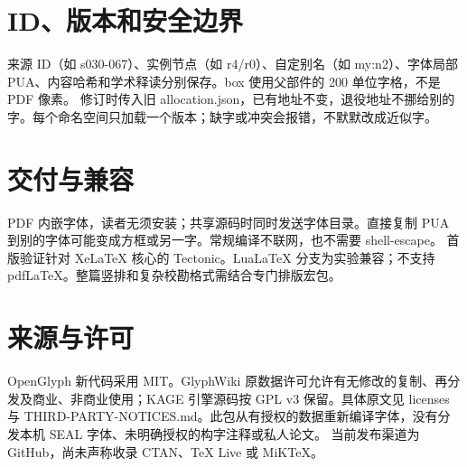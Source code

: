 \documentclass[UTF8,fontset=fandol]{ctexart}
\begin{document}
\section{ID、版本和安全边界}
来源 ID（如 s030-067）、实例节点（如 r4/r0）、自定别名（如 my:n2）、字体局部 PUA、内容哈希和学术释读分别保存。box 使用父部件的 200 单位字格，不是 PDF 像素。
修订时传入旧 allocation.json，已有地址不变，退役地址不挪给别的字。每个命名空间只加载一个版本；缺字或冲突会报错，不默默改成近似字。

\section{交付与兼容}
PDF 内嵌字体，读者无须安装；共享源码时同时发送字体目录。直接复制 PUA 到别的字体可能变成方框或另一字。常规编译不联网，也不需要 shell-escape。
首版验证针对 XeLaTeX 核心的 Tectonic。LuaLaTeX 分支为实验兼容；不支持 pdfLaTeX。整篇竖排和复杂校勘格式需结合专门排版宏包。

\section{来源与许可}
OpenGlyph 新代码采用 MIT。GlyphWiki 原数据许可允许有无修改的复制、再分发及商业、非商业使用；KAGE 引擎源码按 GPL v3 保留。具体原文见 licenses 与 THIRD-PARTY-NOTICES.md。此包从有授权的数据重新编译字体，没有分发本机 SEAL 字体、未明确授权的构字注释或私人论文。
当前发布渠道为 GitHub，尚未声称收录 CTAN、TeX Live 或 MiKTeX。
\end{document}
